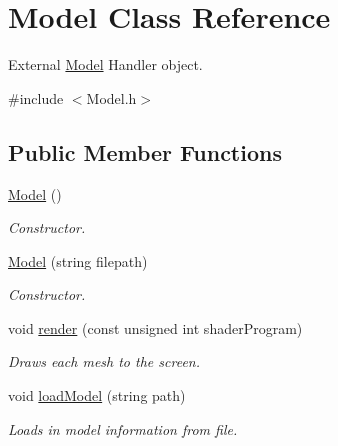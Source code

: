 \hypertarget{class_model}{}\section{Model Class Reference}
\label{class_model}


External \mbox{\hyperlink{class_model}{Model}} Handler object.  




{\ttfamily \#include $<$Model.\+h$>$}

\subsection*{Public Member Functions}
\begin{DoxyCompactItemize}
\item 
\mbox{\label{class_model_ae3b375de5f6df4faf74a95d64748e048}} 
\mbox{\hyperlink{class_model_ae3b375de5f6df4faf74a95d64748e048}{Model}} ()
\begin{DoxyCompactList}\small\item\em Constructor. \end{DoxyCompactList}\item 
\mbox{\label{class_model_a4a90abd11a1c4e47f1b704e28e147dfb}} 
\mbox{\hyperlink{class_model_a4a90abd11a1c4e47f1b704e28e147dfb}{Model}} (string filepath)
\begin{DoxyCompactList}\small\item\em Constructor. \end{DoxyCompactList}\item 
\mbox{\label{class_model_a0885da76930d0f3b919eaa10ae08e8ab}} 
void \mbox{\hyperlink{class_model_a0885da76930d0f3b919eaa10ae08e8ab}{render}} (const unsigned int shader\+Program)
\begin{DoxyCompactList}\small\item\em Draws each mesh to the screen. \end{DoxyCompactList}\item 
\mbox{\label{class_model_a293cf3e4b03935164fbee0fab62c78cd}} 
void \mbox{\hyperlink{class_model_a293cf3e4b03935164fbee0fab62c78cd}{load\+Model}} (string path)
\begin{DoxyCompactList}\small\item\em Loads in model information from file. \end{DoxyCompactList}\item 

\end{DoxyCompactItemize}
